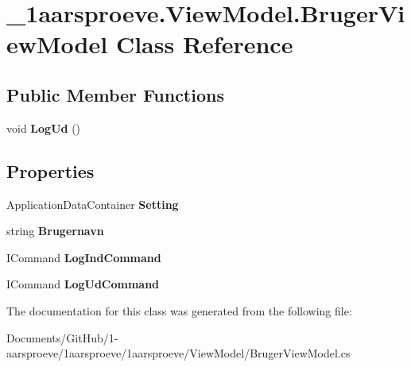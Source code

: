 \hypertarget{class__1aarsproeve_1_1_view_model_1_1_bruger_view_model}{}\section{\+\_\+1aarsproeve.\+View\+Model.\+Bruger\+View\+Model Class Reference}
\label{class__1aarsproeve_1_1_view_model_1_1_bruger_view_model}
\subsection*{Public Member Functions}
\begin{DoxyCompactItemize}
\item 
\hypertarget{class__1aarsproeve_1_1_view_model_1_1_bruger_view_model_a8c2d6da5fad3a9bdbbde9ce986dcbc74}{}void {\bfseries Log\+Ud} ()\label{class__1aarsproeve_1_1_view_model_1_1_bruger_view_model_a8c2d6da5fad3a9bdbbde9ce986dcbc74}

\end{DoxyCompactItemize}
\subsection*{Properties}
\begin{DoxyCompactItemize}
\item 
\hypertarget{class__1aarsproeve_1_1_view_model_1_1_bruger_view_model_ac9e91065596a741027a1b88853bd76e6}{}Application\+Data\+Container {\bfseries Setting}\label{class__1aarsproeve_1_1_view_model_1_1_bruger_view_model_ac9e91065596a741027a1b88853bd76e6}

\item 
\hypertarget{class__1aarsproeve_1_1_view_model_1_1_bruger_view_model_a63b4a8aa59a8e3e2ec0d7285c2ce6caa}{}string {\bfseries Brugernavn}\label{class__1aarsproeve_1_1_view_model_1_1_bruger_view_model_a63b4a8aa59a8e3e2ec0d7285c2ce6caa}

\item 
\hypertarget{class__1aarsproeve_1_1_view_model_1_1_bruger_view_model_a40fed761861b9387bc47a92a2f1e55fd}{}I\+Command {\bfseries Log\+Ind\+Command}\label{class__1aarsproeve_1_1_view_model_1_1_bruger_view_model_a40fed761861b9387bc47a92a2f1e55fd}

\item 
\hypertarget{class__1aarsproeve_1_1_view_model_1_1_bruger_view_model_afc1d332a62edcc717d3e1764db42c89a}{}I\+Command {\bfseries Log\+Ud\+Command}\label{class__1aarsproeve_1_1_view_model_1_1_bruger_view_model_afc1d332a62edcc717d3e1764db42c89a}

\end{DoxyCompactItemize}


The documentation for this class was generated from the following file\+:\begin{DoxyCompactItemize}
\item 
Documents/\+Git\+Hub/1-\/aarsproeve/1aarsproeve/1aarsproeve/\+View\+Model/Bruger\+View\+Model.\+cs\end{DoxyCompactItemize}
